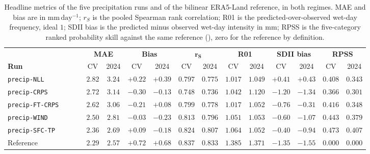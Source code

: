 \begin{table}[H]
\centering
\caption[Headline precipitation metrics, CV holdout vs 2024]{Headline metrics of the five
precipitation runs and of the bilinear ERA5-Land reference, in both regimes. MAE and bias are in
$\mathrm{mm\,day^{-1}}$; $r_{S}$ is the pooled Spearman rank correlation; R01 is the predicted-over-observed
wet-day frequency, ideal $1$; SDII bias is the predicted minus observed wet-day intensity in
$\mathrm{mm}$; RPSS is the five-category ranked probability skill against the same reference
(), zero for the reference by definition.}
\label{tab:single-precip-headline}
\footnotesize
\setlength{\tabcolsep}{3.5pt}
\begin{tabular}{|l|cc|cc|cc|cc|cc|cc|}
\hline
& \multicolumn{2}{c|}{\textbf{MAE}} & \multicolumn{2}{c|}{\textbf{Bias}} &
\multicolumn{2}{c|}{$\boldsymbol{r_{S}}$} & \multicolumn{2}{c|}{\textbf{R01}} &
\multicolumn{2}{c|}{\textbf{SDII bias}} & \multicolumn{2}{c|}{\textbf{RPSS}} \\
\textbf{Run} & CV & 2024 & CV & 2024 & CV & 2024 & CV & 2024 & CV & 2024 & CV & 2024 \\
\hline
\texttt{precip-NLL}     & $2.82$ & $3.24$ & $+0.22$ & $+0.39$ & $0.797$ & $0.775$ & $1.017$ & $1.049$ & $+0.41$ & $+0.43$ & $0.408$ & $0.343$ \\
\hline
\texttt{precip-CRPS}    & $2.72$ & $3.14$ & $-0.30$ & $-0.13$ & $0.748$ & $0.736$ & $1.042$ & $1.120$ & $-1.20$ & $-1.34$ & $0.366$ & $0.301$ \\
\hline
\texttt{precip-FT-CRPS} & $2.62$ & $3.06$ & $-0.21$ & $+0.08$ & $0.799$ & $0.778$ & $1.017$ & $1.052$ & $-0.76$ & $-0.31$ & $0.416$ & $0.348$ \\
\hline
\texttt{precip-WIND}    & $2.50$ & $2.81$ & $-0.03$ & $-0.23$ & $0.813$ & $0.796$ & $1.051$ & $1.053$ & $-0.60$ & $-1.07$ & $0.443$ & $0.379$ \\
\hline
\texttt{precip-SFC-TP}  & $2.36$ & $2.69$ & $+0.09$ & $-0.18$ & $0.824$ & $0.807$ & $1.064$ & $1.052$ & $-0.40$ & $-0.94$ & $0.473$ & $0.407$ \\
\hline
Reference               & $2.29$ & $2.57$ & $+0.72$ & $+0.68$ & $0.837$ & $0.833$ & $1.385$ & $1.371$ & $-1.35$ & $-1.55$ & $0.000$ & $0.000$ \\
\hline
\end{tabular}
\end{table}

